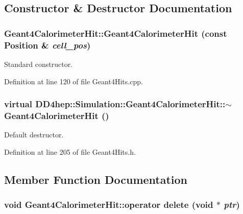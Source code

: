 \subsection{Constructor \& Destructor Documentation}
\hypertarget{class_d_d4hep_1_1_simulation_1_1_geant4_calorimeter_hit_abbd57e0eab3a707b644a29c32006228c}{
\subsubsection[{Geant4CalorimeterHit}]{\setlength{\rightskip}{0pt plus 5cm}Geant4CalorimeterHit::Geant4CalorimeterHit (const {\bf Position} \& {\em cell\_\-pos})}}
\label{class_d_d4hep_1_1_simulation_1_1_geant4_calorimeter_hit_abbd57e0eab3a707b644a29c32006228c}


Standard constructor. 

Definition at line 120 of file Geant4Hits.cpp.\hypertarget{class_d_d4hep_1_1_simulation_1_1_geant4_calorimeter_hit_aa1c4edd85a2375d70f7cfc135f17b9cb}{
\subsubsection[{$\sim$Geant4CalorimeterHit}]{\setlength{\rightskip}{0pt plus 5cm}virtual DD4hep::Simulation::Geant4CalorimeterHit::$\sim$Geant4CalorimeterHit ()}}
\label{class_d_d4hep_1_1_simulation_1_1_geant4_calorimeter_hit_aa1c4edd85a2375d70f7cfc135f17b9cb}


Default destructor. 

Definition at line 205 of file Geant4Hits.h.

\subsection{Member Function Documentation}
\hypertarget{class_d_d4hep_1_1_simulation_1_1_geant4_calorimeter_hit_a974038503b2e2fa0d988b802ad5c29e2}{
\subsubsection[{operator delete}]{\setlength{\rightskip}{0pt plus 5cm}void Geant4CalorimeterHit::operator delete (void $\ast$ {\em ptr})}}
\label{class_d_d4hep_1_1_simulation_1_1_geant4_calorimeter_hit_a974038503b2e2fa0d988b802ad5c29e2}


